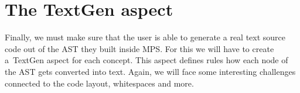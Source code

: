 \section{The TextGen aspect}
Finally, we must make sure that the user is able to generate a real text source code out of the AST they built inside MPS. For this we will have to create a~TextGen aspect for each concept. This aspect defines rules how each node of the AST gets converted into text. Again, we will face some interesting challenges connected to the code layout, whitespaces and more.